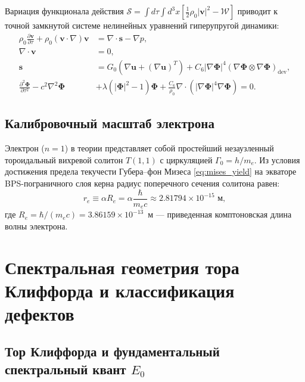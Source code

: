 \documentclass[11pt,a4paper,oneside]{article}
\theoremstyle{plain}
\theoremstyle{definition}
\theoremstyle{remark}
\numberwithin{equation}{section}
\begin{document}
	Вариация функционала действия $\mathcal{S} = \int d\tau \int d^3x \left[ \frac{1}{2}\rho_0 |\mathbf{v}|^2 - \mathcal{W} \right]$ приводит к точной замкнутой системе нелинейных уравнений гиперупругой динамики:
	\begin{align}
		\rho_0 \frac{\partial \mathbf{v}}{\partial \tau} + \rho_0 (\mathbf{v}\cdot\nabla)\mathbf{v} &= \nabla \cdot \mathbf{s} - \nabla p, \label{eq:navier_cauchy} \\
		\nabla \cdot \mathbf{v} &= 0, \label{eq:solenoidal_v} \\
		\mathbf{s} &= G_0 \left( \nabla \mathbf{u} + (\nabla \mathbf{u})^T \right) + C_6 |\nabla \boldsymbol{\Phi}|^4 \left( \nabla \boldsymbol{\Phi} \otimes \nabla \boldsymbol{\Phi} \right)_{\text{dev}}, \label{eq:stress_constitutive} \\
		\frac{\partial^2 \boldsymbol{\Phi}}{\partial \tau^2} - c^2 \nabla^2 \boldsymbol{\Phi} &+ \lambda \left( |\boldsymbol{\Phi}|^2 - 1 \right) \boldsymbol{\Phi} + \frac{C_6}{\rho_0} \nabla \cdot \left( |\nabla \boldsymbol{\Phi}|^4 \nabla \boldsymbol{\Phi} \right) = 0. \label{eq:order_param_pde}
	\end{align}
	
	\subsection{Калибровочный масштаб электрона}
	
	Электрон ($n=1$) в теории представляет собой простейший незаузленный тороидальный вихревой солитон $T(1,1)$ с циркуляцией $\Gamma_0 = h/m_e$. Из условия достижения предела текучести Губера--фон Мизеса \eqref{eq:mises_yield} на экваторе BPS-пограничного слоя керна радиус поперечного сечения солитона равен:
	\begin{equation}
		r_e \equiv \alpha R_e = \alpha \frac{\hbar}{m_e c} \approx 2.81794 \times 10^{-15} \text{ м},
	\end{equation}
	где $R_e = \hbar / (m_e c) = 3.86159 \times 10^{-13}$~м — приведенная комптоновская длина волны электрона.
	
	\section{Спектральная геометрия тора Клиффорда и классификация дефектов}
	
	\subsection{Тор Клиффорда и фундаментальный спектральный квант $E_0$}
	
\end{document}
